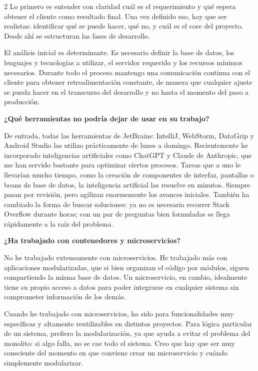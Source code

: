 \documentclass[10pt,spanish,Letterpaper,openany]{book}
\let\origtextbf\textbf
\renewcommand{\textbf}[1]{{\color{textlinetitle}\origtextbf{#1}}}
\begin{document}
\begin {multicols}{2}
Lo primero es entender con claridad cuál es el requerimiento y qué espera obtener el cliente como resultado final. Una vez definido eso, hay que ser realistas: identificar qué se puede hacer, qué no, y cuál es el core del proyecto. Desde ahí se estructuran las fases de desarrollo.

El análisis inicial es determinante. Es necesario definir la base de datos, los lenguajes y tecnologías a utilizar, el servidor requerido y los recursos mínimos necesarios. Durante todo el proceso mantengo una comunicación continua con el cliente para obtener retroalimentación constante, de manera que cualquier ajuste se pueda hacer en el transcurso del desarrollo y no hasta el momento del paso a producción.

\textbf{¿Qué herramientas no podría dejar de usar en su trabajo?}

De entrada, todas las herramientas de JetBrains: IntelliJ, WebStorm, DataGrip y Android Studio las utilizo prácticamente de lunes a domingo. Recientemente he incorporado inteligencias artificiales como ChatGPT y Claude de Anthropic, que me han servido bastante para optimizar ciertos procesos. Tareas que a uno le llevarían mucho tiempo, como la creación de componentes de interfaz, pantallas o beans de base de datos, la inteligencia artificial las resuelve en minutos. Siempre pasan por revisión, pero agilizan enormemente los avances iniciales. También ha cambiado la forma de buscar soluciones: ya no es necesario recorrer Stack Overflow durante horas; con un par de preguntas bien formuladas se llega rápidamente a la raíz del problema.

\textbf{¿Ha trabajado con contenedores y microservicios?}

No he trabajado extensamente con microservicios. He trabajado más con aplicaciones modularizadas, que si bien organizan el código por módulos, siguen compartiendo la misma base de datos. Un microservicio, en cambio, idealmente tiene su propio acceso a datos para poder integrarse en cualquier sistema sin comprometer información de los demás.

Cuando he trabajado con microservicios, ha sido para funcionalidades muy específicas y altamente reutilizables en distintos proyectos. Para lógica particular de un sistema, prefiero la modularización, ya que ayuda a evitar el problema del monolito: si algo falla, no se cae todo el sistema. Creo que hay que ser muy consciente del momento en que conviene crear un microservicio y cuándo simplemente modularizar.


\end{multicols}
\end{document}

